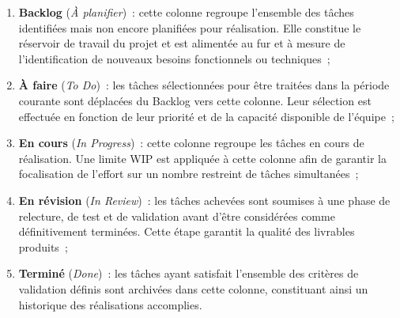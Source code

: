 \begin{enumerate}
	\item \textbf{Backlog} (\textit{À planifier})~: cette colonne
	regroupe l'ensemble des tâches identifiées mais non encore
	planifiées pour réalisation. Elle constitue le réservoir de travail
	du projet et est alimentée au fur et à mesure de l'identification
	de nouveaux besoins fonctionnels ou techniques~;
	
	\item \textbf{À faire} (\textit{To Do})~: les tâches sélectionnées
	pour être traitées dans la période courante sont déplacées du
	Backlog vers cette colonne. Leur sélection est effectuée en
	fonction de leur priorité et de la capacité disponible de l'équipe~;
	
	\item \textbf{En cours} (\textit{In Progress})~: cette colonne
	regroupe les tâches en cours de réalisation. Une limite WIP est
	appliquée à cette colonne afin de garantir la focalisation de
	l'effort sur un nombre restreint de tâches simultanées~;
	
	\item \textbf{En révision} (\textit{In Review})~: les tâches
	achevées sont soumises à une phase de relecture, de test et de
	validation avant d'être considérées comme définitivement terminées.
	Cette étape garantit la qualité des livrables produits~;
	
	\item \textbf{Terminé} (\textit{Done})~: les tâches ayant satisfait
	l'ensemble des critères de validation définis sont archivées dans
	cette colonne, constituant ainsi un historique des réalisations
	accomplies.
\end{enumerate}

\usetikzlibrary{shadows} %


